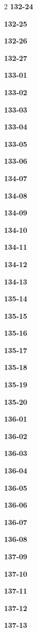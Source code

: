 \documentclass[10pt,a4paper]{article}
\begin{document}
\begin{multicols}{2}
\noindent\textbf{132-24}\ \par
\noindent\textbf{132-25}\ \par
\noindent\textbf{132-26}\ \par
\noindent\textbf{132-27}\ \par
\noindent\textbf{133-01}\ \par
\noindent\textbf{133-02}\ \par
\noindent\textbf{133-03}\ \par
\noindent\textbf{133-04}\ \par
\noindent\textbf{133-05}\ \par
\noindent\textbf{133-06}\ \par
\noindent\textbf{134-07}\ \par
\noindent\textbf{134-08}\ \par
\noindent\textbf{134-09}\ \par
\noindent\textbf{134-10}\ \par
\noindent\textbf{134-11}\ \par
\noindent\textbf{134-12}\ \par
\noindent\textbf{134-13}\ \par
\noindent\textbf{135-14}\ \par
\noindent\textbf{135-15}\ \par
\noindent\textbf{135-16}\ \par
\noindent\textbf{135-17}\ \par
\noindent\textbf{135-18}\ \par
\noindent\textbf{135-19}\ \par
\noindent\textbf{135-20}\ \par
\noindent\textbf{136-01}\ \par
\noindent\textbf{136-02}\ \par
\noindent\textbf{136-03}\ \par
\noindent\textbf{136-04}\ \par
\noindent\textbf{136-05}\ \par
\noindent\textbf{136-06}\ \par
\noindent\textbf{136-07}\ \par
\noindent\textbf{136-08}\ \par
\noindent\textbf{137-09}\ \par
\noindent\textbf{137-10}\ \par
\noindent\textbf{137-11}\ \par
\noindent\textbf{137-12}\ \par
\noindent\textbf{137-13}\ \par

\end{multicols}
\end{document}
